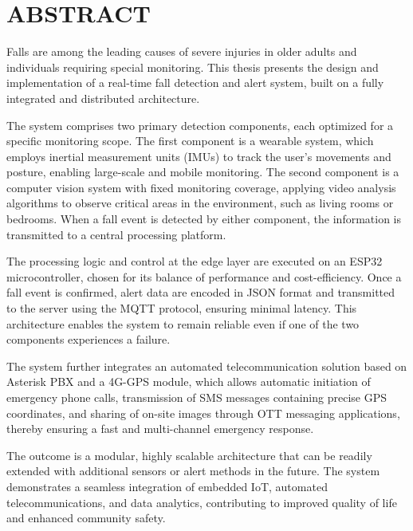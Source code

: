 
\chapter*{ABSTRACT}

Falls are among the leading causes of severe injuries in older adults and individuals requiring special monitoring. This thesis presents the design and implementation of a real-time fall detection and alert system, built on a fully integrated and distributed architecture.

The system comprises two primary detection components, each optimized for a specific monitoring scope. The first component is a wearable system, which employs inertial measurement units (IMUs) to track the user’s movements and posture, enabling large-scale and mobile monitoring. The second component is a computer vision system with fixed monitoring coverage, applying video analysis algorithms to observe critical areas in the environment, such as living rooms or bedrooms. When a fall event is detected by either component, the information is transmitted to a central processing platform.

The processing logic and control at the edge layer are executed on an ESP32 microcontroller, chosen for its balance of performance and cost-efficiency. Once a fall event is confirmed, alert data are encoded in JSON format and transmitted to the server using the MQTT protocol, ensuring minimal latency. This architecture enables the system to remain reliable even if one of the two components experiences a failure.

The system further integrates an automated telecommunication solution based on Asterisk PBX and a 4G-GPS module, which allows automatic initiation of emergency phone calls, transmission of SMS messages containing precise GPS coordinates, and sharing of on-site images through OTT messaging applications, thereby ensuring a fast and multi-channel emergency response.

The outcome is a modular, highly scalable architecture that can be readily extended with additional sensors or alert methods in the future. The system demonstrates a seamless integration of embedded IoT, automated telecommunications, and data analytics, contributing to improved quality of life and enhanced community safety.
